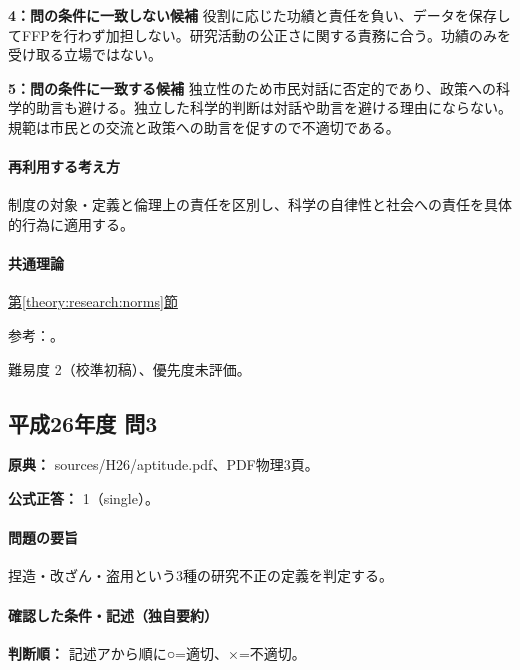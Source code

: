 \noindent\textbf{4：問の条件に一致しない候補} 役割に応じた功績と責任を負い、データを保存してFFPを行わず加担しない。研究活動の公正さに関する責務に合う。功績のみを受け取る立場ではない。\par

\noindent\textbf{5：問の条件に一致する候補} 独立性のため市民対話に否定的であり、政策への科学的助言も避ける。独立した科学的判断は対話や助言を避ける理由にならない。規範は市民との交流と政策への助言を促すので不適切である。\par

\paragraph{再利用する考え方} 制度の対象・定義と倫理上の責任を区別し、科学の自律性と社会への責任を具体的行為に適用する。

\paragraph{共通理論} \hyperref[theory:research:norms]{第\ref*{theory:research:norms}節}

\par 参考：\cite{scj_code2013}。

\par 難易度 2（校準初稿）、優先度未評価。

\subsection{平成26年度 問3}
\label{q:h26-reg-apt-03}

\noindent\textbf{原典：} sources/H26/aptitude.pdf、PDF物理3頁。

\textbf{公式正答：} 1（single）。

\paragraph{問題の要旨} 捏造・改ざん・盗用という3種の研究不正の定義を判定する。

\paragraph{確認した条件・記述（独自要約）}\mbox{}\par

\noindent\textbf{判断順：} 記述アから順に○=適切、×=不適切。\par

